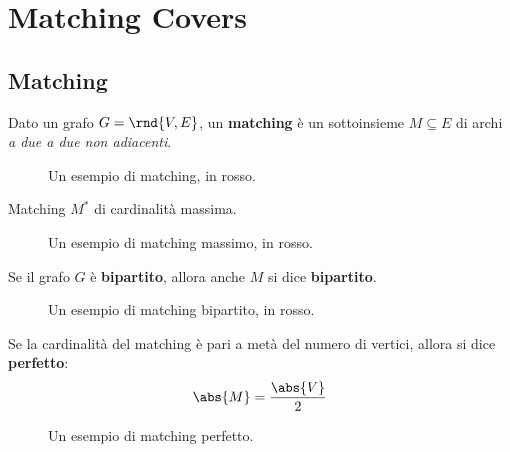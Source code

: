 \documentclass[\main/main.tex]{subfiles}
\begin{document}
\chapter{Matching Covers}



\section{Matching}
\setlength\columnsep{25pt}
\begin{multicols}{2}
	\begin{definition}
		Dato un grafo \(G=\rnd{V, E}\), un \textbf{matching} è un sottoinsieme \(M\subseteq E\) di archi \textit{a due a due non adiacenti}.
		\begin{figure}
			\MatchingDefinition{}
			\caption{Un esempio di matching, in rosso.}
		\end{figure}
	\end{definition}
	\begin{definition}
		Matching \(M^*\) di cardinalità massima.
		\begin{figure}
			\MatchingDefinition{}
			\caption{Un esempio di matching massimo, in rosso.}
		\end{figure}
	\end{definition}
	\begin{definition}
		Se il grafo \(G\) è \textbf{bipartito}, allora anche \(M\) si dice \textbf{bipartito}.
		\begin{figure}
			\MatchingDefinition{}
			\caption{Un esempio di matching bipartito, in rosso.}
		\end{figure}
	\end{definition}
	\begin{definition}
		Se la cardinalità del matching è pari a metà del numero di vertici, allora si dice \textbf{perfetto}:
		\[
			\abs{M} = \frac{\abs{V}}{2}
		\]
		\begin{figure}
			\MatchingDefinition{}
			\caption{Un esempio di matching perfetto.}
		\end{figure}
	\end{definition}
\end{multicols}
\end{document}

